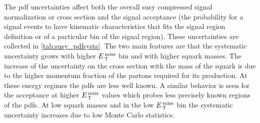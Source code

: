 The \gls{pdf} uncertainties affect both the overall \gls{susy} compressed signal
normalization or cross section and the signal acceptance (the probability for a
signal events to have kinematic characteristics that fits the signal region
definition or of a particular bin of the signal region). These uncertainties are
collected in \cref{tab:susy_pdfsysts}. The two main features are that the
systematic uncertainty grows with higher $\met$ bin and with higher squark
masses. The increase of the uncertainty on the cross section with the mass of
the squark is due to the higher momentum fraction of the partons required for
its production. At these energy regimes the \glspl{pdf} are less well known. A
similar behavior is seen for the acceptance at higher $\met$ values which probes
less precisely known regions of the \glspl{pdf}. At low squark masses and in the
low $\met$ bin the systematic uncertainty increases due to low Monte Carlo
statistics.
\begin{table}
\centering
\small
{}
\caption{\gls{pdf} systematic uncertainties in \% on the SUSY compressed
  models. The uncertainty is the envelop that contains the signal yields from
  the three \gls{pdf} families, and their error bands. The first row indicates
  the systematic uncertainty on the overall normalisation. The following rows
  show uncertainty on the acceptance in the signal region $\met$ bins.}
\label{tab:susy_pdfsysts}
\end{table}
